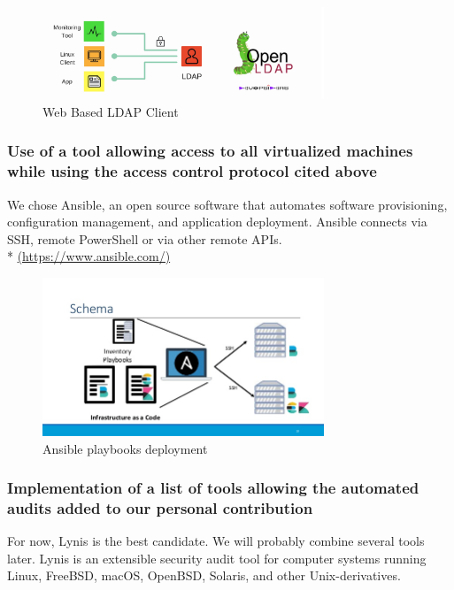 \begin{figure}[!h]
  \centering
  \includegraphics[width=0.75\textwidth]{images/ldap-example.png}
  \caption{Web Based LDAP Client}
  \label{LDAP}
\end{figure}

\subsubsection{Use of a tool allowing access to all virtualized machines while using the access control protocol cited above}
\vspace{0.5cm}

We chose Ansible, an open source software that automates software
provisioning, configuration management, and application deployment.
Ansible connects via SSH, remote PowerShell or via other remote APIs.\\ *
\url{(https://www.ansible.com/)}

\begin{figure}[!h]
  \centering
  \includegraphics[width=0.75\textwidth]{images/ansible-example.jpg}
  \caption{Ansible playbooks deployment}
  \label{Ansible}
\end{figure}

\pagebreak

\subsubsection{Implementation of a list of tools allowing the automated audits added to our
  personal contribution}

For now, Lynis is the best candidate. We will probably combine several tools later.
Lynis is an extensible security audit tool for computer systems
running Linux, FreeBSD, macOS, OpenBSD, Solaris, and other
Unix-derivatives.
\\

